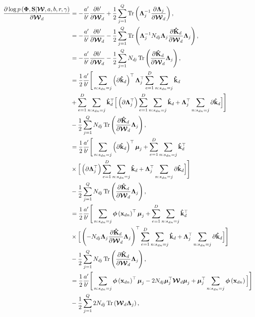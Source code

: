 	\begin{align}
	\frac{\partial \log p\left(\boldsymbol{\Phi},\mathbf{S}|\boldsymbol{\mathcal{W}},a,b,r,\gamma\right)}{\partial\boldsymbol{\mathcal{W}}_d} &=
	-\frac{a'}{b'}\frac{\partial b'}{\partial\boldsymbol{\mathcal{W}}_d}+\frac{1}{2}\sum_{j=1}^{Q} \operatorname{Tr}\left(\boldsymbol{\Lambda}_j^{-1}\frac{\partial \boldsymbol{\Lambda}_j}{\partial\boldsymbol{\mathcal{W}}_d}\right),\notag\\
	& =  -\frac{a'}{b'}\frac{\partial b'}{\partial\boldsymbol{\mathcal{W}}_d}-\frac{1}{2}\sum_{j=1}^{Q} \operatorname{Tr}\left(\boldsymbol{\Lambda}_j^{-1}N_{dj}\boldsymbol{\Lambda}_j\frac{ \partial \mathbf{\hat{K}}_d}{\partial\boldsymbol{\mathcal{W}}_d} \boldsymbol{\Lambda}_j\right),\notag \\
	& =  -\frac{a'}{b'}\frac{\partial b'}{\partial\boldsymbol{\mathcal{W}}_d}-\frac{1}{2}\sum_{j=1}^{Q}N_{dj} \operatorname{Tr}\left(\frac{ \partial \mathbf{\hat{K}}_d}{\partial\boldsymbol{\mathcal{W}}_d} \boldsymbol{\Lambda}_j\right),\notag \\
	& =  \frac{1}{2}\frac{a'}{b'}  \Bigg[\sum\limits_{n:s_{dn}=j}  \left(\partial \mathbf{\hat{k}}_d\right)^\top\boldsymbol{\Lambda}_j^\top  \sum\limits_{e=1}^{D}\sum\limits_{n:s_{dn}=j}\mathbf{\hat{k}}_d\notag\\
	&  + \sum\limits_{e=1}^{D}\sum\limits_{n:s_{dn}=j}\mathbf{\hat{k}}_d^\top \Big[\left(\partial \boldsymbol{\Lambda}_j^\top\right) \sum\limits_{e=1}^{D}\sum\limits_{n:s_{dn}=j} \mathbf{\hat{k}}_d +\boldsymbol{\Lambda}_j^\top \sum\limits_{n:s_{dn}=j} \partial\mathbf{\hat{k}}_d\Big]
	\Bigg] \notag\\
	& -\frac{1}{2}\sum_{j=1}^{Q}N_{dj} \operatorname{Tr}\left(\frac{ \partial \mathbf{\hat{K}}_d}{\partial\boldsymbol{\mathcal{W}}_d} \boldsymbol{\Lambda}_j\right), \\
	& =  \frac{1}{2}\frac{a'}{b'}  \Bigg[\sum\limits_{n:s_{dn}=j}  \left(\partial \mathbf{\hat{k}}_d\right)^\top\boldsymbol{\mu}_j  + \sum\limits_{e=1}^{D}\sum\limits_{n:s_{dn}=j}\mathbf{\hat{k}}_d^\top \notag\\
	& \times\Big[\left(\partial \boldsymbol{\Lambda}_j^\top\right) \sum\limits_{e=1}^{D}\sum\limits_{n:s_{dn}=j} \mathbf{\hat{k}}_d +\boldsymbol{\Lambda}_j^\top \sum\limits_{n:s_{dn}=j} \partial\mathbf{\hat{k}}_d\Big]
	\Bigg] \notag\\
	& -\frac{1}{2}\sum_{j=1}^{Q}N_{dj} \operatorname{Tr}\left(\frac{ \partial \mathbf{\hat{K}}_d}{\partial\boldsymbol{\mathcal{W}}_d} \boldsymbol{\Lambda}_j\right), \notag \\
	& =  \frac{1}{2}\frac{a'}{b'}  \Bigg[\sum\limits_{n:s_{dn}=j}  \boldsymbol{\phi}\left(\mathbf{x}_{dn}\right)^\top\boldsymbol{\mu}_j  + \sum\limits_{e=1}^{D}\sum\limits_{n:s_{dn}=j}\mathbf{\hat{k}}_d^\top \notag\\
	& \times\Big[\left(-N_{dj}\boldsymbol{\Lambda}_j\frac{ \partial \mathbf{\hat{K}}_d}{\partial\boldsymbol{\mathcal{W}}_d} \boldsymbol{\Lambda}_j\right)^\top \sum\limits_{e=1}^{D}\sum\limits_{n:s_{dn}=j} \mathbf{\hat{k}}_d +\boldsymbol{\Lambda}_j^\top \sum\limits_{n:s_{dn}=j} \partial\mathbf{\hat{k}}_d\Big]
	\Bigg] \notag\\
	& -\frac{1}{2}\sum_{j=1}^{Q}N_{dj} \operatorname{Tr}\left(\frac{ \partial \mathbf{\hat{K}}_d}{\partial\boldsymbol{\mathcal{W}}_d} \boldsymbol{\Lambda}_j\right), \notag \\
	& =  \frac{1}{2}\frac{a'}{b'}  \Bigg[\sum\limits_{n:s_{dn}=j}  \boldsymbol{\phi}\left(\mathbf{x}_{dn}\right)^\top\boldsymbol{\mu}_j  - 2N_{dj}\boldsymbol{\mu}_j^\top\boldsymbol{\mathcal{W}}_d\boldsymbol{\mu}_j
	+\boldsymbol{\mu}_j^\top \sum\limits_{n:s_{dn}=j} \boldsymbol{\phi}\left(\mathbf{x}_{dn}\right)\Big]
	\Bigg] \notag\\
	& -\frac{1}{2}\sum_{j=1}^{Q}2N_{dj} \operatorname{Tr}\left(\boldsymbol{\mathcal{W}}_d \boldsymbol{\Lambda}_j\right),
	\end{align}
	
